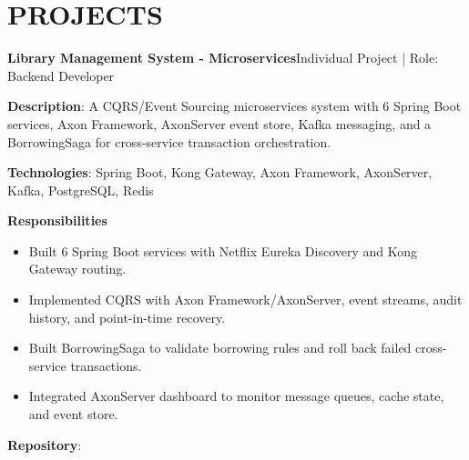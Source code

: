 \section{PROJECTS}
\resumeSubHeadingListStart

  \resumeProjectHeading
    {\textbf{Library Management System - Microservices}}{Individual Project | Role: Backend Developer}
    \resumeItemListStart
      \item \textbf{Description}: A CQRS/Event Sourcing microservices system with 6 Spring Boot services, Axon Framework,
        AxonServer event store, Kafka messaging, and a BorrowingSaga for cross-service transaction orchestration.
      \item \textbf{Technologies}: Spring Boot, Kong Gateway, Axon Framework, AxonServer, Kafka, PostgreSQL, Redis
      \item \textbf{Responsibilities}
        \begin{itemize}
          \item Built 6 Spring Boot services with Netflix Eureka Discovery and Kong Gateway routing.
          \item Implemented CQRS with Axon Framework/AxonServer, event streams, audit history, and point-in-time recovery.
          \item Built BorrowingSaga to validate borrowing rules and roll back failed cross-service transactions.
          \item Integrated AxonServer dashboard to monitor message queues, cache state, and event store.
        \end{itemize}
      \item \textbf{Repository}: \href{https://github.com/nvminh162/backend-library-system}{}
    \resumeItemListEnd

